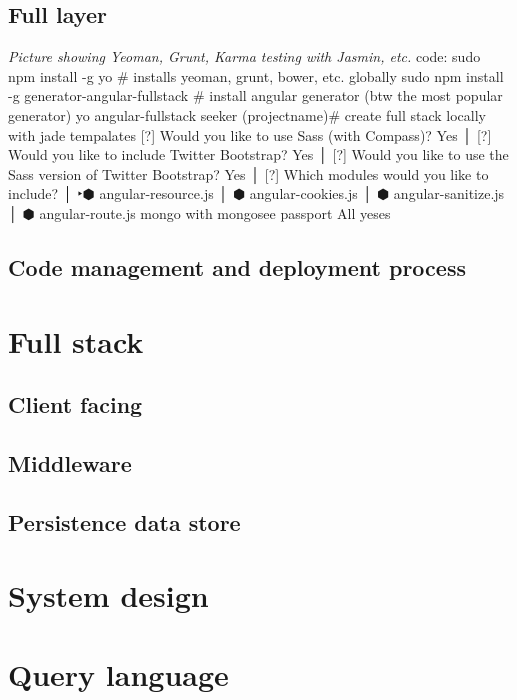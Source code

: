 \documentclass[a4paper]{tufte-book}
\begin{document}
\subsection{Full layer}
\emph{Picture showing Yeoman, Grunt, Karma testing with Jasmin, etc.}
code: sudo npm install -g yo \# installs yeoman, grunt, bower, etc. globally
sudo npm install -g generator-angular-fullstack \# install angular generator (btw the most popular generator)
yo angular-fullstack seeker (projectname)\# create full stack locally with jade tempalates
[?] Would you like to use Sass (with Compass)? Yes                               │
[?] Would you like to include Twitter Bootstrap? Yes                             │
[?] Would you like to use the Sass version of Twitter Bootstrap? Yes             │
[?] Which modules would you like to include?                                     │
‣⬢ angular-resource.js                                                           │
 ⬢ angular-cookies.js                                                            │
 ⬢ angular-sanitize.js                                                           │
 ⬢ angular-route.js 
 mongo with mongosee
 passport 
 All yeses
\subsection{Code management and deployment process}

\section{Full stack}
\subsection{Client facing}
\subsection{Middleware}
\subsection{Persistence data store}


\section{System design}

\section{Query language}
\end{document}
